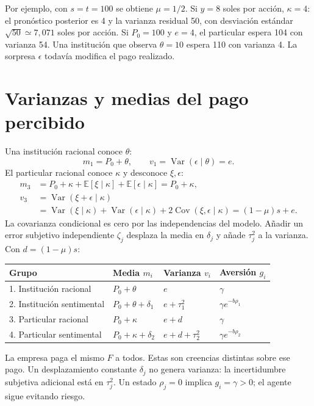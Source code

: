 \documentclass[11pt]{article}
\newcommand{\E}{\mathbb E}
\newcommand{\Var}{\operatorname{Var}}
\newcommand{\Cov}{\operatorname{Cov}}
\begin{document}
Por ejemplo, con $s=t=100$ se obtiene $\mu=1/2$. Si $y=8$ soles por acción,
$\kappa=4$: el pronóstico posterior es 4 y la varianza residual 50, con
desviación estándar $\sqrt{50}\simeq7{,}071$ soles por acción.
Si $P_0=100$ y $e=4$, el particular espera 104 con varianza 54.
Una institución que observa $\theta=10$ espera 110 con varianza 4.
La sorpresa $\epsilon$ todavía modifica el pago realizado.

\section{Varianzas y medias del pago percibido}
Una institución racional conoce $\theta$:
\begin{equation}
 m_1=P_0+\theta,\qquad v_1=\Var(\epsilon\mid\theta)=e.
\end{equation}
El particular racional conoce $\kappa$ y desconoce $\xi,\epsilon$:
\begin{align}
 m_3&=P_0+\kappa+\E[\xi\mid\kappa]+\E[\epsilon\mid\kappa]=P_0+\kappa,\\
 v_3&=\Var(\xi+\epsilon\mid\kappa)\\
 &=\Var(\xi\mid\kappa)+\Var(\epsilon\mid\kappa)
       +2\Cov(\xi,\epsilon\mid\kappa)=(1-\mu)s+e.
\end{align}
La covarianza condicional es cero por las independencias del modelo.
Añadir un error subjetivo independiente $\zeta_j$ desplaza la media en
$\delta_j$ y añade $\tau_j^2$ a la varianza. Con $d=(1-\mu)s$:
\begin{center}\small
\begin{tabular}{llll}
\toprule
Grupo & Media $m_i$ & Varianza $v_i$ & Aversión $g_i$\\
\midrule
1. Institución racional & $P_0+\theta$ & $e$ & $\gamma$\\
2. Institución sentimental & $P_0+\theta+\delta_1$ & $e+\tau_1^2$ & $\gamma e^{-b\rho_1}$\\
3. Particular racional & $P_0+\kappa$ & $e+d$ & $\gamma$\\
4. Particular sentimental & $P_0+\kappa+\delta_2$ & $e+d+\tau_2^2$ & $\gamma e^{-b\rho_2}$\\
\bottomrule
\end{tabular}
\end{center}
La empresa paga el mismo $F$ a todos. Estas son creencias distintas sobre
ese pago. Un desplazamiento constante $\delta_j$ no genera varianza:
la incertidumbre subjetiva adicional está en $\tau_j^2$.
Un estado $\rho_j=0$ implica $g_i=\gamma>0$; el agente sigue evitando riesgo.
\end{document}
